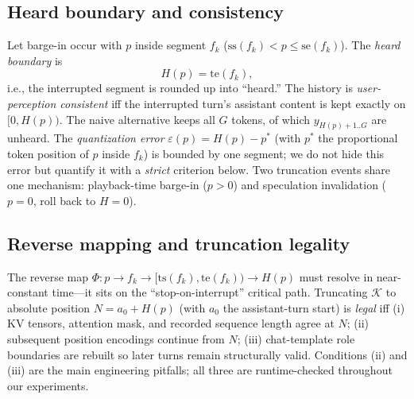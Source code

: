\documentclass[conference]{IEEEtran}
\begin{document}
\subsection{Heard boundary and consistency}
Let barge-in occur with $p$ inside segment $f_k$ ($\mathrm{ss}(f_k)<p\le \mathrm{se}(f_k)$). The \emph{heard boundary} is
\begin{equation}
H(p)=\mathrm{te}(f_k), \label{eq:boundary}
\end{equation}
i.e., the interrupted segment is rounded up into ``heard.'' The history is \emph{user-perception consistent} iff the interrupted turn's assistant content is kept exactly on $[0,H(p))$. The naive alternative keeps all $G$ tokens, of which $y_{H(p)+1..G}$ are unheard. The \emph{quantization error} $\varepsilon(p)=H(p)-p^{\ast}$ (with $p^{\ast}$ the proportional token position of $p$ inside $f_k$) is bounded by one segment; we do not hide this error but quantify it with a \emph{strict} criterion below. Two truncation events share one mechanism: playback-time barge-in ($p>0$) and speculation invalidation ($p=0$, roll back to $H=0$).

\subsection{Reverse mapping and truncation legality}
The reverse map $\Phi: p \rightarrow f_k \rightarrow [\mathrm{ts}(f_k),\mathrm{te}(f_k)) \rightarrow H(p)$ must resolve in near-constant time---it sits on the ``stop-on-interrupt'' critical path. Truncating $\mathcal{K}$ to absolute position $N=a_0+H(p)$ (with $a_0$ the assistant-turn start) is \emph{legal} iff (i) KV tensors, attention mask, and recorded sequence length agree at $N$; (ii) subsequent position encodings continue from $N$; (iii) chat-template role boundaries are rebuilt so later turns remain structurally valid. Conditions (ii) and (iii) are the main engineering pitfalls; all three are runtime-checked throughout our experiments.
\end{document}
